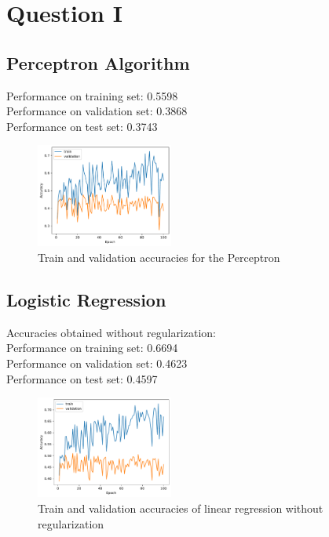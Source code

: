 \section{Question I}
\subsection{Perceptron Algorithm}

Performance on training set: 0.5598 \\
Performance on validation set: 0.3868 \\
Performance on test set: 0.3743 \\

\begin{figure}[H]
    \centering
    \includegraphics[width=0.4\textwidth]{images/Q1-perceptron-accs.pdf} 
    \caption{Train and validation accuracies for the Perceptron}
    \label{fig:dd}
\end{figure}



\subsection{Logistic Regression}
Accuracies obtained without regularization: \\
Performance on training set: 0.6694 \\
Performance on validation set: 0.4623 \\
Performance on test set:  0.4597\\

\begin{figure}[H]
    \centering
    \includegraphics[width=0.4\textwidth]{images/Q1-logistic_regression-accs.pdf} 
    \caption{Train and validation accuracies of linear regression without regularization }
    \label{fig:no_reg_acc_log_reg}
\end{figure}

